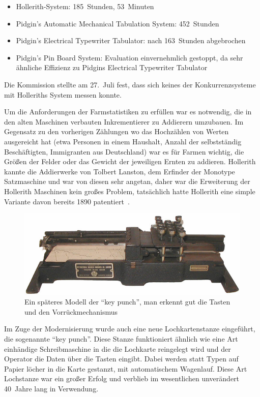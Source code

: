 \documentclass[parskip=half]{scrartcl}
\begin{document}
\begin{itemize}
  \item Hollerith-System: 185~Stunden, 53~Minuten
  \item Pidgin's Automatic Mechanical Tabulation System: 452~Stunden
  \item Pidgin's Electrical Typewriter Tabulator: nach 163~Stunden abgebrochen
  \item Pidgin's Pin Board System: Evaluation einvernehmlich gestoppt, da sehr
    ähnliche Effizienz zu Pidgins Electrical Typewriter Tabulator
\end{itemize}

Die Kommission stellte am 27.~Juli fest, dass sich keines der Konkurrenzsysteme
mit Holleriths System messen konnte.

Um die Anforderungen der Farmstatistiken zu erfüllen war es notwendig, die in
den alten Maschinen verbauten Inkrementierer zu Addierern umzubauen. Im
Gegensatz zu den vorherigen Zählungen wo das Hochzählen von Werten ausgereicht
hat (etwa Personen in einem Haushalt, Anzahl der selbstständig Beschäftigten,
Immigranten aus Deutschland) war es für Farmen wichtig, die Größen der Felder
oder das Gewicht der jeweiligen Ernten zu addieren. Hollerith kannte die
Addierwerke von Tolbert Lanston, dem Erfinder der Monotype Satzmaschine und war
von diesen sehr angetan, daher war die Erweiterung der Hollerith Maschinen kein
großes Problem, tatsächlich hatte Hollerith eine simple Variante davon bereits
1890 patentiert~\cite{truesdell1965development}.

\begin{figure}[h]
  \centering
  \includegraphics[width=\textwidth]{keypunch}
  \caption{Ein späteres Modell der \enquote{key punch}, man erkennt gut die
    Tasten und den Vorrückmechanismus~\cite{keypunch}}
  \label{fig:keypunch}
\end{figure}

Im Zuge der Modernisierung wurde auch eine neue Lochkartenstanze eingeführt,
die sogenannte \enquote{key punch}. Diese Stanze funktioniert ähnlich wie eine
Art einhändige Schreibmaschine in die die Lochkarte reingelegt wird und der
Operator die Daten über die Tasten eingibt. Dabei werden statt Typen auf Papier
löcher in die Karte gestanzt, mit automatischem Wagenlauf. Diese Art Lochstanze
war ein großer Erfolg und verblieb im wesentlichen unverändert 40~Jahre lang in
Verwendung.
\end{document}
